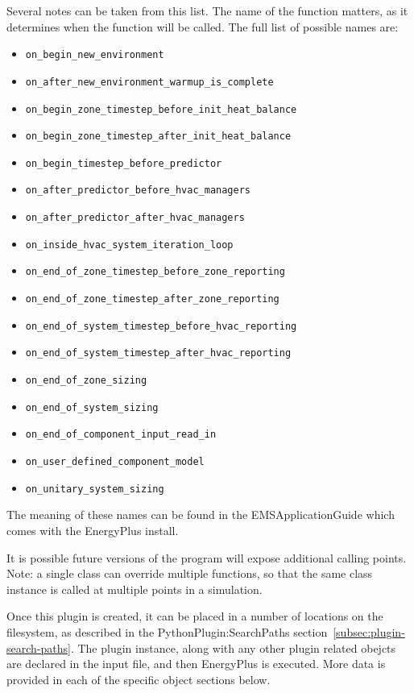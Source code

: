 Several notes can be taken from this list.
The name of the function matters, as it determines when the function will be called.
The full list of possible names are:
\begin{itemize}
    \item \verb=on_begin_new_environment=
    \item \verb=on_after_new_environment_warmup_is_complete=
    \item \verb=on_begin_zone_timestep_before_init_heat_balance=
    \item \verb=on_begin_zone_timestep_after_init_heat_balance=
    \item \verb=on_begin_timestep_before_predictor=
    \item \verb=on_after_predictor_before_hvac_managers=
    \item \verb=on_after_predictor_after_hvac_managers=
    \item \verb=on_inside_hvac_system_iteration_loop=
    \item \verb=on_end_of_zone_timestep_before_zone_reporting=
    \item \verb=on_end_of_zone_timestep_after_zone_reporting=
    \item \verb=on_end_of_system_timestep_before_hvac_reporting=
    \item \verb=on_end_of_system_timestep_after_hvac_reporting=
    \item \verb=on_end_of_zone_sizing=
    \item \verb=on_end_of_system_sizing=
    \item \verb=on_end_of_component_input_read_in=
    \item \verb=on_user_defined_component_model=
    \item \verb=on_unitary_system_sizing=
\end{itemize}

The meaning of these names can be found in the EMSApplicationGuide which comes with the EnergyPlus install.

It is possible future versions of the program will expose additional calling points.
Note: a single class can override multiple functions, so that the same class instance is called at multiple points in a simulation.

Once this plugin is created, it can be placed in a number of locations on the filesystem, as described in the PythonPlugin:SearchPaths section~\ref{subsec:plugin-search-paths}.
The plugin instance, along with any other plugin related obejcts are declared in the input file, and then EnergyPlus is executed.
More data is provided in each of the specific object sections below.

